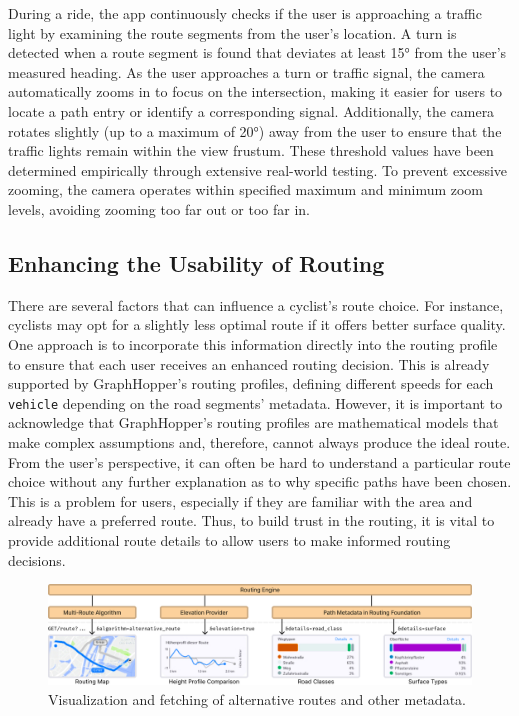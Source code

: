 During a ride, the app continuously checks if the user is approaching a traffic light by examining the route segments from the user's location. A turn is detected when a route segment is found that deviates at least 15° from the user's measured heading. As the user approaches a turn or traffic signal, the camera automatically zooms in to focus on the intersection, making it easier for users to locate a path entry or identify a corresponding signal. Additionally, the camera rotates slightly (up to a maximum of 20°) away from the user to ensure that the traffic lights remain within the view frustum. These threshold values have been determined empirically through extensive real-world testing. To prevent excessive zooming, the camera operates within specified maximum and minimum zoom levels, avoiding zooming too far out or too far in.

\subsection{Enhancing the Usability of Routing }

There are several factors that can influence a cyclist's route choice. For instance, cyclists may opt for a slightly less optimal route if it offers better surface quality. One approach is to incorporate this information directly into the routing profile to ensure that each user receives an enhanced routing decision. This is already supported by GraphHopper's routing profiles, defining different speeds for each \texttt{vehicle} depending on the road segments' metadata. However, it is important to acknowledge that GraphHopper's routing profiles are mathematical models that make complex assumptions and, therefore, cannot always produce the ideal route. From the user's perspective, it can often be hard to understand a particular route choice without any further explanation as to why specific paths have been chosen. This is a problem for users, especially if they are familiar with the area and already have a preferred route. Thus, to build trust in the routing, it is vital to provide additional route details to allow users to make informed routing decisions.

\begin{figure}[htbp]
\centering
\includegraphics[width=\linewidth]{images/graphhopper-data-flow.png}
\caption{Visualization and fetching of alternative routes and other metadata.}
\label{fig:graphhopper-data-flow}
\end{figure}

